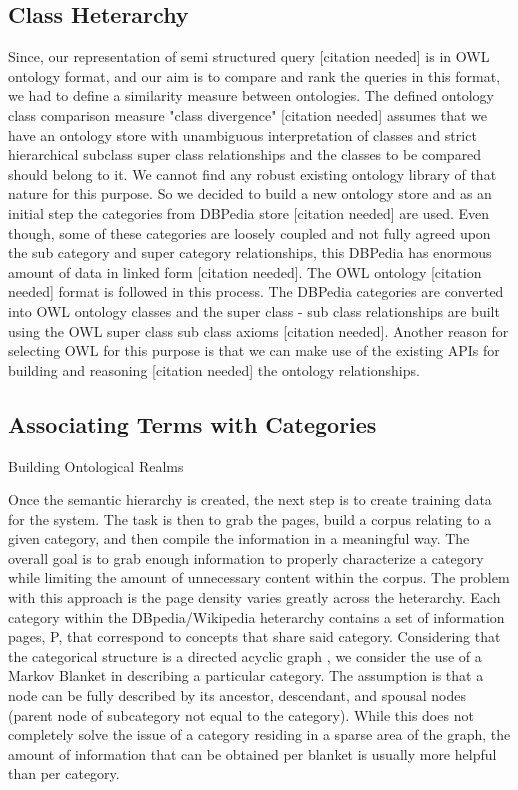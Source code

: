 \subsection{Class Heterarchy} 
Since, our representation of semi structured query [citation needed] is in OWL ontology format, and our aim is to compare and rank the queries in this format, we had to define a similarity measure between ontologies. The defined ontology class comparison measure "class divergence" [citation needed] assumes that we have an ontology store with unambiguous interpretation of classes and strict hierarchical subclass super class relationships and the classes to be compared should belong to it. We cannot find any robust existing ontology library of that nature for this purpose. So we decided to build a new ontology store and as an initial step the categories from DBPedia store [citation needed] are used. Even though, some of these categories are loosely coupled and not fully agreed upon the sub category and super category relationships, this DBPedia has enormous amount of data in linked form [citation needed]. The OWL ontology [citation needed] format is followed in this process. The DBPedia categories are converted into OWL ontology classes and the super class - sub class relationships are built using the OWL super class sub class axioms [citation needed]. Another reason for selecting OWL for this purpose is that we can make use of the existing APIs for building and reasoning [citation needed] the ontology relationships.





\subsection{Associating Terms with Categories}

Building Ontological Realms
 
Once the semantic hierarchy is created, the next step is to create training data for the system. The task is then to grab the pages, build a corpus relating to a given category, and then compile the information in a meaningful way. The overall goal is to grab enough information to properly characterize a category while limiting the amount of unnecessary content within the corpus. The problem with this approach is the page density varies greatly across the heterarchy. Each category within the DBpedia/Wikipedia heterarchy contains a set of information pages, P, that correspond to concepts that share said category. Considering that the categorical structure is a directed acyclic graph  \cite{Suchanek07yago:a}, we consider the use of a Markov Blanket \cite{Friedman97bayesiannetwork} in describing a particular category. The assumption is that a node can be fully described by its ancestor, descendant, and spousal nodes (parent node of subcategory not equal to the category). While this does not completely solve the issue of a category residing in a sparse area of the graph, the amount of information that can be obtained per blanket is usually more helpful than per category.
 
